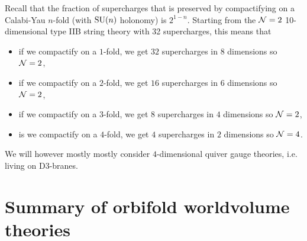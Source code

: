     Recall that the fraction of supercharges that is preserved by compactifying on a Calabi-Yau $n$-fold (with $\text{SU}(n)$ holonomy) is $2^{1-n}$. Starting from the $\mathcal{N}=2$ 10-dimensional type IIB string theory with 32 supercharges, this means that
    \begin{itemize}
        \item if we compactify on a $1$-fold, we get $32$ supercharges in $8$ dimensions so $\mathcal{N}=2$,
        \item if we compactify on a $2$-fold, we get $16$ supercharges in $6$ dimensions so $\mathcal{N}=2$,
        \item if we compactify on a $3$-fold, we get $8$ supercharges in $4$ dimensions so $\mathcal{N}=2$,
        \item is we compactify on a $4$-fold, we get $4$ supercharges in $2$ dimensions so $\mathcal{N}=4$.
    \end{itemize}

    We will however mostly mostly consider $4$-dimensional quiver gauge theories, i.e. living on D$3$-branes.

\section{Summary of orbifold worldvolume theories}

